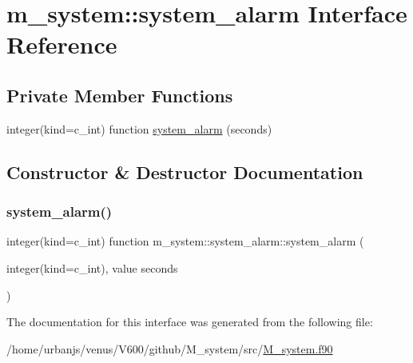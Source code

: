 \hypertarget{interfacem__system_1_1system__alarm}{}\section{m\+\_\+system\+:\+:system\+\_\+alarm Interface Reference}
\label{interfacem__system_1_1system__alarm}
\subsection*{Private Member Functions}
\begin{DoxyCompactItemize}
\item 
integer(kind=c\+\_\+int) function \mbox{\hyperlink{interfacem__system_1_1system__alarm_abfb54a33612dc231d46be41819c3405c}{system\+\_\+alarm}} (seconds)
\end{DoxyCompactItemize}


\subsection{Constructor \& Destructor Documentation}
\mbox{\label{interfacem__system_1_1system__alarm_abfb54a33612dc231d46be41819c3405c}} 
\subsubsection{\texorpdfstring{system\+\_\+alarm()}{system\_alarm()}}
{\footnotesize\ttfamily integer(kind=c\+\_\+int) function m\+\_\+system\+::system\+\_\+alarm\+::system\+\_\+alarm (\begin{DoxyParamCaption}\item[{integer(kind=c\+\_\+int), value}]{seconds }\end{DoxyParamCaption})\hspace{0.3cm}{\ttfamily [private]}}



The documentation for this interface was generated from the following file\+:\begin{DoxyCompactItemize}
\item 
/home/urbanjs/venus/\+V600/github/\+M\+\_\+system/src/\mbox{\hyperlink{M__system_8f90}{M\+\_\+system.\+f90}}\end{DoxyCompactItemize}
